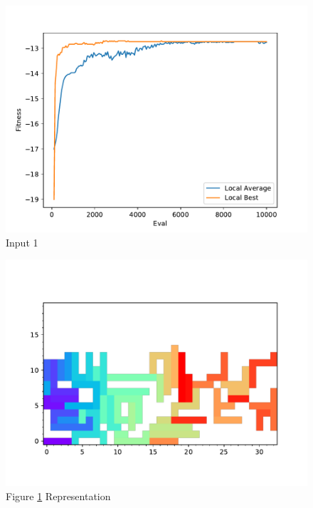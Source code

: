 \documentclass{standalone}
\begin{document}
\begin{figure}[!htb]
	\caption{Input 1}
	\label{fig:graph_1004}
	\includegraphics[width=\textwidth]{../graphs/graphs/1004.pdf}
\end{figure}


\begin{figure}[!htb]
	\caption{Figure \ref{fig:graph_1004} Representation}
	\label{fig:picture_1004}
	\includegraphics[width=\textwidth]{../graphs/picture/1004.pdf}
\end{figure}
\end{document}
